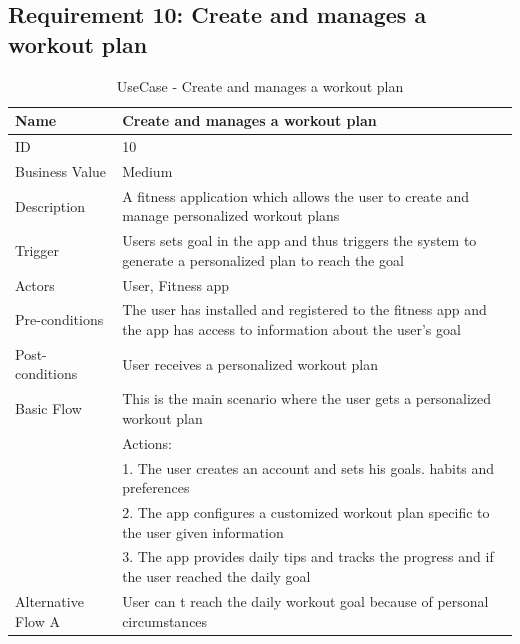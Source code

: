 \documentclass{article}
\begin{document}
	\subsection{Requirement 10: Create and manages a workout plan}
		\begin{table}[htbp]
			\centering
			\captionsetup{labelformat=empty}
			\caption{UseCase - Create and manages a workout plan}
			\begin{tabularx}{\textwidth}{|>{\raggedright\arraybackslash}p{}|X|}
				\hline
				Name             & Create and manages a workout plan                                \\ \hline
				ID               & 10                                                                                       \\ \hline
				Business Value   & Medium                                                                                    \\ \hline
				Description      & A fitness application which allows the user to create and manage personalized workout plans \\ \hline
				Trigger          & Users sets goal in the app and thus triggers the system to generate a personalized plan to reach the goal \\ \hline
				Actors           & User, Fitness app                                 \\ \hline
				Pre-conditions   & The user has installed and registered to the fitness app and the app has access to information about the user's goal                                    \\ \hline
				Post-conditions  & User receives a personalized workout plan                                                         \\ \hline
				Basic Flow       & This is the main scenario where the user gets a personalized workout plan \\ \hline
								 & Actions: \\
								 & 1. The user creates an account and sets his goals. habits and preferences \\
								 & 2. The app configures a customized workout plan specific to the user given information \\
								 & 3. The app provides daily tips and tracks the progress and if the user reached the daily goal \\ \hline
				Alternative Flow A & User can t reach the daily workout goal because of personal circumstances \\

\end{tabularx}
\end{table}
\end{document}
